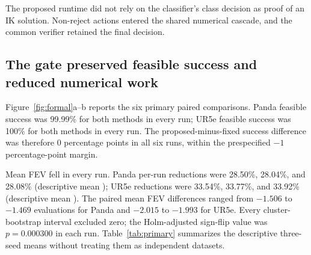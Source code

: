 \documentclass[10pt,a4paper]{article}
\begin{document}
The proposed runtime did not rely on the classifier's class decision as proof of an IK
solution. Non-reject actions entered the shared numerical cascade, and the common
verifier retained the final decision.

\subsection{The gate preserved feasible success and reduced numerical work}

Figure~\ref{fig:formal}a--b reports the six primary paired comparisons. Panda feasible
success was 99.99\% for both methods in every run; UR5e feasible success was 100\% for
both methods in every run. The proposed-minus-fixed success difference was therefore
0 percentage points in all six runs, within the prespecified $-1$ percentage-point
margin.

Mean FEV fell in every run. Panda per-run reductions were 28.50\%, 28.04\%, and
28.08\% (descriptive mean \PandaFEVReduction{}); UR5e reductions were 33.54\%,
33.77\%, and 33.92\% (descriptive mean \URFEVReduction{}). The paired mean FEV
differences ranged from $-1.506$ to $-1.469$ evaluations for Panda and $-2.015$ to
$-1.993$ for UR5e. Every cluster-bootstrap interval excluded zero; the Holm-adjusted
sign-flip value was $p=0.000300$ in each run. Table~\ref{tab:primary} summarizes the
descriptive three-seed means without treating them as independent datasets.

\begin{table}[H]
\centering
\caption{Primary formal-test outcomes. Values are descriptive means over three
training-seed runs on the same locked test set within each robot. FEV is function
evaluations. Each P95 entry is the mean of three per-run percentiles, not a pooled
percentile.}
\label{tab:primary}
\end{table}
\end{document}
